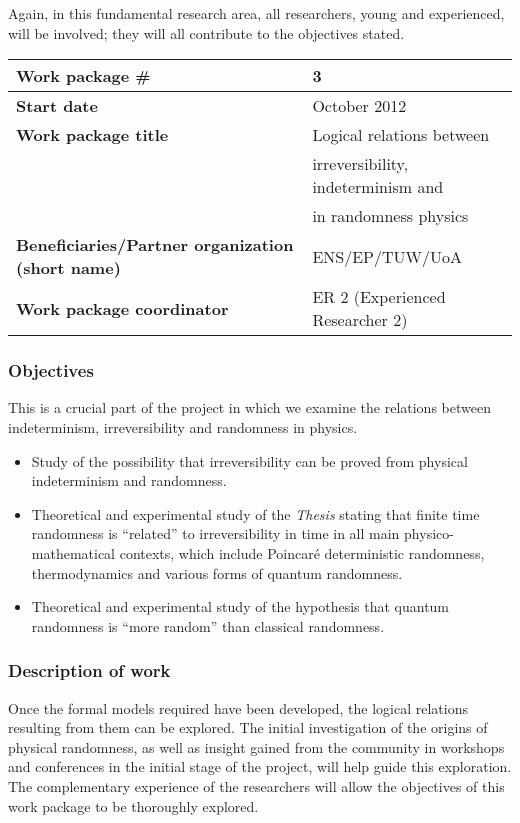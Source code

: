 \documentclass[12pt]{article}
\begin{document}
Again,
in this fundamental research area,
all researchers, young and experienced, will be involved; they will all contribute to the objectives stated.



\begin{center}
{
\begin{tabular}{|l|l|}
\hline
{\bf Work  package \#}&3\\
\hline
{\bf Start date}&October 2012\\
\hline
{\bf Work  package title}&Logical relations between \\&   irreversibility, indeterminism and\\&  in randomness physics\\
\hline
{\bf Beneficiaries/Partner organization (short name)}&ENS/EP/TUW/UoA\\
\hline
{\bf Work  package coordinator}&ER 2 (Experienced Researcher 2)\\
\hline
\end{tabular}
}
\end{center}

\subsubsection*{Objectives}

This is a crucial part of the project in which we examine the relations between  indeterminism, irreversibility  and randomness in physics.
\begin{itemize}
\item Study of the possibility that irreversibility can be proved from physical indeterminism and randomness.
\item
Theoretical and experimental study of the  {\it Thesis}  stating that  finite time randomness is ``related'' to irreversibility in time in all main
 physico-mathematical contexts, which include Poincar\'e deterministic randomness, thermodynamics and various forms of quantum randomness.
 \item Theoretical and experimental study of the hypothesis that quantum randomness is ``more random'' than classical randomness.\end{itemize}

\subsubsection*{Description of work}
Once the formal models required have been developed, the logical relations resulting from them can be explored. The initial investigation of the origins of physical randomness, as well as insight gained from the community in workshops and conferences in the initial stage of the project, will help guide this exploration. The complementary experience of the researchers will allow the objectives of this work package to be thoroughly explored.
\fi
\end{document}
